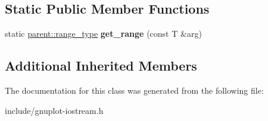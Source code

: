 \subsection*{Static Public Member Functions}
\begin{DoxyCompactItemize}
\item 
\mbox{\label{classgnuplotio_1_1ArrayTraits_3_01T_00_01typename_01boost_1_1enable__if_3_01boost_1_1mpl_1_1and_371638f7d82cde4b7a8a064d0797371a_aec07e01edbb46f5f283d5b6af068c0f2}} 
static \hyperlink{structgnuplotio_1_1Error__WasNotContainer}{parent\+::range\+\_\+type} {\bfseries get\+\_\+range} (const T \&arg)
\end{DoxyCompactItemize}
\subsection*{Additional Inherited Members}


The documentation for this class was generated from the following file\+:\begin{DoxyCompactItemize}
\item 
include/gnuplot-\/iostream.\+h\end{DoxyCompactItemize}
